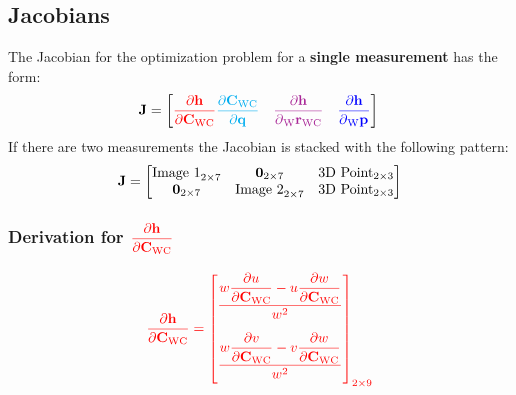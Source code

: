 \subsection*{Jacobians}

The Jacobian for the optimization problem for a \textbf{single measurement} has
the form:
%
\begin{equation}
  \jac = \begin{bmatrix}
    \color{red}
    \dfrac{\partial{\projFunc}}{\partial \camRot}
    \color{cyan}
    \dfrac{\partial{\camRot}}{\partial{\quat}} \quad
    \color{Mulberry}
    \dfrac{\partial{\projFunc}}{\partial \camPos} \quad
    \color{blue}
    \dfrac{\partial{\projFunc}}{\partial \Pt{\world}}
  \end{bmatrix} \\
\end{equation}
%
If there are two measurements the Jacobian is stacked with the following
pattern:
%
\begin{equation}
  {{\mathbf{J}}} = \begin{bmatrix}
    \text{Image 1}_{2 \times 7}
      & {{\mathbf{0}}_{2\times7}}
      & \text{3D Point}_{2 \times 3} \\
    {{\mathbf{0}}_{2\times7}}
      & \text{Image 2}_{2 \times 7}
      & \text{3D Point}_{2 \times 3}
  \end{bmatrix}
\end{equation}


\subsubsection*{Derivation for
$\color{red}
\dfrac{\partial{{{\mathbf{h}}}}}{\partial{{{{{{{\mathbf{C}}}}_{{\text{W}}{\text{C}}}}}}}}$}

\begin{align}
  \color{red}
  \dfrac{\partial{\projFunc}}{\partial{\camRot}} =
  \begin{bmatrix}
    \dfrac{
      w \dfrac{\partial{u}}{\partial{\camRot}} -
      u \dfrac{\partial{w}}{\partial{\camRot}}
    }{w^{2}} \vspace{1.0em} \\
    \dfrac{
      w \dfrac{\partial{v}}{\partial{\camRot}} -
      v \dfrac{\partial{w}}{\partial{\camRot}}
    }{w^{2}} \vspace{0.5em}
  \end{bmatrix}_{2 \times 9}
\end{align}

